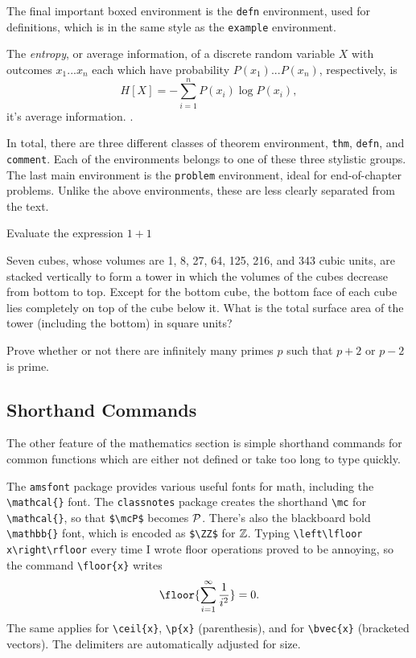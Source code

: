 \documentclass[11pt]{article}
\begin{document}
The final important boxed environment is the \verb|defn| environment, used for definitions, which is in the same style as the \verb|example| environment.
\begin{defn}[Entropy]
	The \textit{entropy}, or average information, of a discrete random variable $X$ with outcomes $x_1...x_n$ each which have probability $P(x_1)...P(x_n)$, respectively, is
	\[H[X] = -\sum_{i=1}^n P(x_i)\log P(x_i),\]
	it's average information. \cite{shannon1948}.
\end{defn}
In total, there are three different classes of theorem environment, \verb|thm|, \verb|defn|, and \verb|comment|. Each of the environments belongs to one of these three stylistic groups. The last main environment is the \verb|problem| environment, ideal for end-of-chapter problems. Unlike the above environments, these are less clearly separated from the text.
\begin{problem}
	Evaluate the expression $1 + 1$
\end{problem}
\begin{problem}[AMC 12 \#17]
	Seven cubes, whose volumes are 1, 8, 27, 64, 125, 216, and 343 cubic units, are stacked vertically to form a tower in which the volumes of the cubes decrease from bottom to top. Except for the bottom cube, the bottom face of each cube lies completely on top of the cube below it. What is the total surface area of the tower (including the bottom) in square units?
\end{problem}
\begin{problem}
	Prove whether or not there are infinitely many primes $p$ such that $p + 2$ or $p-2$ is prime.
\end{problem}

\subsection{Shorthand Commands}
The other feature of the mathematics section is simple shorthand commands for common functions which are either not defined or take too long to type quickly.

The \texttt{amsfont} package provides various useful fonts for math, including the \verb|\mathcal{}| font. The \texttt{classnotes} package creates the shorthand \verb|\mc| for \verb|\mathcal{}|, so that \verb|$\mcP$| becomes $\mathcal{P}$. There's also the blackboard bold \verb|\mathbb{}| font, which is encoded as \verb|$\ZZ$| for $\mathbb{Z}$.
Typing \verb|\left\lfloor x\right\rfloor| every time I wrote floor operations proved to be annoying, so the command \verb|\floor{x}| writes
\[\floor{\sum_{i=1}^{\infty} \frac{1}{i^2}} = 0.\]
The same applies for \verb|\ceil{x}|, \verb|\p{x}| (parenthesis), and for \verb|\bvec{x}| (bracketed vectors). The delimiters are automatically adjusted for size.
\end{document}
